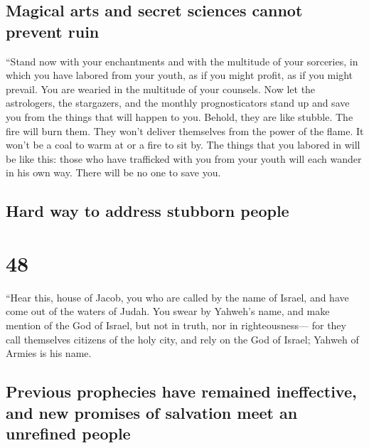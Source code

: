 \hypertarget{magical-arts-and-secret-sciences-cannot-prevent-ruin}{%
\subsection{Magical arts and secret sciences cannot prevent
ruin}\label{magical-arts-and-secret-sciences-cannot-prevent-ruin}}

 ``Stand now with your enchantments and with the
multitude of your sorceries, in which you have labored from your youth,
as if you might profit, as if you might prevail.  You are
wearied in the multitude of your counsels. Now let the astrologers, the
stargazers, and the monthly prognosticators stand up and save you from
the things that will happen to you.  Behold, they are
like stubble. The fire will burn them. They won't deliver themselves
from the power of the flame. It won't be a coal to warm at or a fire to
sit by.  The things that you labored in will be like
this: those who have trafficked with you from your youth will each
wander in his own way. There will be no one to save you.

\hypertarget{hard-way-to-address-stubborn-people}{%
\subsection{Hard way to address stubborn
people}\label{hard-way-to-address-stubborn-people}}

\hypertarget{section-47}{%
\section{48}\label{section-47}}

 ``Hear this, house of Jacob, you who are called by the
name of Israel, and have come out of the waters of Judah. You swear by
Yahweh's name, and make mention of the God of Israel, but not in truth,
nor in righteousness---  for they call themselves citizens
of the holy city, and rely on the God of Israel; Yahweh of Armies is his
name.

\hypertarget{previous-prophecies-have-remained-ineffective-and-new-promises-of-salvation-meet-an-unrefined-people}{%
\subsection{Previous prophecies have remained ineffective, and new
promises of salvation meet an unrefined
people}\label{previous-prophecies-have-remained-ineffective-and-new-promises-of-salvation-meet-an-unrefined-people}}

